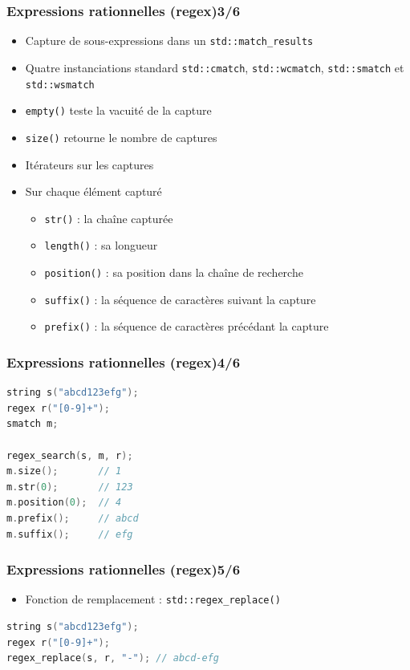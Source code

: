 \documentclass[C++.tex]{subfiles}
\begin{document}
\begin{frame}[fragile]
	\frametitle{Expressions rationnelles (regex)\titlehfill{}3/6}
	\begin{itemize}
		\item Capture de sous-expressions dans un \lstinline|std::match_results|
		\item Quatre instanciations standard \lstinline|std::cmatch|, \lstinline|std::wcmatch|, \lstinline|std::smatch| et \lstinline|std::wsmatch|
		\item \lstinline|empty()| teste la vacuité de la capture
		\item \lstinline|size()| retourne le nombre de captures
		\item Itérateurs sur les captures
		\item Sur chaque élément capturé
		\begin{itemize}
			\item \lstinline|str()| : la chaîne capturée
			\item \lstinline|length()| : sa longueur
			\item \lstinline|position()| : sa position dans la chaîne de recherche
			\item \lstinline|suffix()| : la séquence de caractères suivant la capture
			\item \lstinline|prefix()| : la séquence de caractères précédant la capture
		\end{itemize}
	\end{itemize}
\end{frame}

\begin{frame}[fragile]
	\frametitle{Expressions rationnelles (regex)\titlehfill{}4/6}
	\begin{lstlisting}[language=C++]
string s("abcd123efg");
regex r("[0-9]+");
smatch m;

regex_search(s, m, r);
m.size();       // 1
m.str(0);       // 123
m.position(0);  // 4
m.prefix();     // abcd
m.suffix();     // efg\end{lstlisting}
\end{frame}

\begin{frame}[fragile]
	\frametitle{Expressions rationnelles (regex)\titlehfill{}5/6}
	\begin{itemize}
		\item Fonction de remplacement : \lstinline|std::regex_replace()|
	\end{itemize}

	\begin{lstlisting}[language=C++]
string s("abcd123efg");
regex r("[0-9]+");
regex_replace(s, r, "-"); // abcd-efg\end{lstlisting}
\end{frame}
\end{document}
